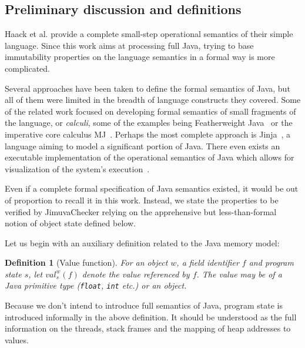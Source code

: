 \documentclass{pracamgr}
\theoremstyle{break}
\newtheorem{defi}{Definition}
\theoremstyle{break}
\theoremstyle{break}
\begin{document}
\subsection{Preliminary discussion and definitions}

Haack et al. provide a complete small-step operational semantics of
their simple language. Since this work aims at processing full Java,
trying to base immutability properties on the language semantics in a
formal way is more complicated.

Several approaches have been taken to define the formal semantics of
Java, but all of them were limited in the breadth of language
constructs they covered. Some of the related work focused on
developing formal semantics of small fragments of the language, or
\emph{calculi}, some of the examples being Featherweight
Java~\cite{javasem:feather} or the imperative core calculus
MJ~\cite{javasem:mj}. Perhaps the most complete approach is
Jinja~\cite{javasem:jinja}, a language aiming to model a significant
portion of Java. There even exists an executable implementation of the
operational semantics of Java which allows for visualization of the
system's execution~\cite{javasem:exec}. 

Even if a complete formal specification of Java semantics existed, it
would be out of proportion to recall it in this work. Instead, we
state the properties to be verified by JimuvaChecker relying on the
apprehensive but less-than-formal notion of object state defined below.

Let us begin with an auxiliary definition related to the Java memory
model:
\begin{defi}[Value function]
  For an object $w$, a field identifier $f$ and program state $s$, let
  $val_s^w(f)$ denote the value referenced by $f$. The value may be of
  a Java primitive type (\texttt{float}, \texttt{int} etc.) or an object.
\end{defi}
Because we don't intend to introduce full semantics of Java, program
state is introduced informally in the above definition. It should
be understood as the full information on the threads, stack frames and
the mapping of heap addresses to values. 
\end{document}
